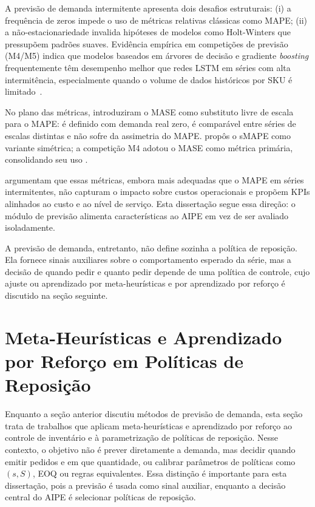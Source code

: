 A previsão de demanda intermitente apresenta dois desafios estruturais: (i) a frequência de zeros impede o uso de métricas relativas clássicas como MAPE; (ii) a não-estacionariedade invalida hipóteses de modelos como Holt-Winters que pressupõem padrões suaves. Evidência empírica em competições de previsão (M4/M5) indica que modelos baseados em árvores de decisão e gradiente \textit{boosting} frequentemente têm desempenho melhor que redes LSTM em séries com alta intermitência, especialmente quando o volume de dados históricos por SKU é limitado~\citep{Nasseri2023RetailDemandPrediction}.

No plano das métricas, \citet{Hyndman2006MASE} introduziram o MASE como substituto livre de escala para o MAPE: é definido com demanda real zero, é comparável entre séries de escalas distintas e não sofre da assimetria do MAPE. \citet{Makridakis1993SMAPE} propôs o sMAPE como variante simétrica; a competição M4 adotou o MASE como métrica primária, consolidando seu uso \citep{Makridakis2020M4Competition}.

\citet{TadayonradNdiaye2023KPIDemandForecasting} argumentam que essas métricas, embora mais adequadas que o MAPE em séries intermitentes, não capturam o impacto sobre custos operacionais e propõem KPIs alinhados ao custo e ao nível de serviço. Esta dissertação segue essa direção: o módulo de previsão alimenta características ao AIPE em vez de ser avaliado isoladamente.

A previsão de demanda, entretanto, não define sozinha a política de reposição. Ela fornece sinais auxiliares sobre o comportamento esperado da série, mas a decisão de quando pedir e quanto pedir depende de uma política de controle, cujo ajuste ou aprendizado por meta-heurísticas e por aprendizado por reforço é discutido na seção seguinte.

\section{Meta-Heurísticas e Aprendizado por Reforço em Políticas de Reposição}

Enquanto a seção anterior discutiu métodos de previsão de demanda, esta seção trata de trabalhos que aplicam meta-heurísticas e aprendizado por reforço ao controle de inventário e à parametrização de políticas de reposição. Nesse contexto, o objetivo não é prever diretamente a demanda, mas decidir quando emitir pedidos e em que quantidade, ou calibrar parâmetros de políticas como $(s,S)$, EOQ ou regras equivalentes. Essa distinção é importante para esta dissertação, pois a previsão é usada como sinal auxiliar, enquanto a decisão central do AIPE é selecionar políticas de reposição.

